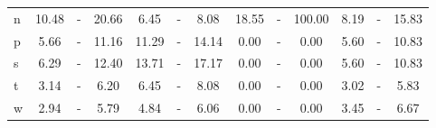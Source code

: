 \begin{table*}[h]
\begin{center}
\begin{tabular}{  l | c   c   c | c   c   c | c   c   c | c   c   c  }
n & 10.48  & -  & 20.66  & 6.45  & -  & 8.08  & 18.55  & -  & 100.00  & 8.19  & -  & 15.83 \\
p & 5.66  & -  & 11.16  & 11.29  & -  & 14.14  & 0.00  & -  & 0.00  & 5.60  & -  & 10.83 \\\hline
s & 6.29  & -  & 12.40  & 13.71  & -  & 17.17  & 0.00  & -  & 0.00  & 5.60  & -  & 10.83 \\
t & 3.14  & -  & 6.20  & 6.45  & -  & 8.08  & 0.00  & -  & 0.00  & 3.02  & -  & 5.83 \\
w & 2.94  & -  & 5.79  & 4.84  & -  & 6.06  & 0.00  & -  & 0.00  & 3.45  & -  & 6.67 \\
\end{tabular}\end{center}
\end{table*}
